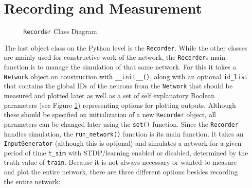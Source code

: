 \section{Recording and Measurement} \label{sec:recording}
\begin{figure}[htbp]
\centering
{}
\caption{\texttt{Recorder} Class Diagram} \label{fig:object_recorder}
\end{figure}
The last object class on the Python level is the \texttt{Recorder}. While the other classes are mainly used for constructive work of the network, the \texttt{Recorder}s main function is to manage the simulation of that same network. For this it takes a \texttt{Network} object on construction with \texttt{\_\_init\_\_()}, along with an optional \texttt{id\_list} that contains the global IDs of the neurons from the \texttt{Network} that should be measured and plotted later as well as a set of self explanatory Boolean parameters (see Figure \ref{fig:object_recorder}) representing options for plotting outputs. Although these should be specified on initialization of a new \texttt{Recorder} object, all parameters can be changed later using the \texttt{set()} function. Since the \texttt{Recorder} handles simulation, the \texttt{run\_network()} function is its main function. It takes an \texttt{InputGenerator} (although this is optional) and simulates a network for a given period of time \texttt{t\_sim} with STDP/learning enabled or disabled, determined by the truth value of \texttt{train}. Because it is not always necessary or wanted to measure and plot the entire network, there are three different options besides recording the entire network:
